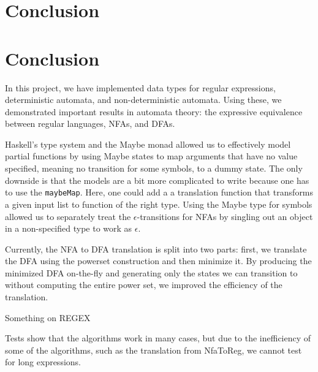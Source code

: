 \section{Conclusion}\label{sec:Conclusion}

\section{Conclusion}\label{sec
}

In this project, we have implemented data types for regular expressions, deterministic automata, and non-deterministic automata. Using these, we demonstrated important results in automata theory: the expressive equivalence between regular languages, NFAs, and DFAs.

Haskell's type system and the Maybe monad allowed us to effectively model partial functions by using Maybe states to map arguments that have no value specified, meaning no transition for some symbols, to a dummy state. The only downside is that the models are a bit more complicated to write because one has to use the \texttt{maybeMap}. Here, one could add a a translation function that transforms a given input list to function of the right type. 
Using the Maybe type for symbols allowed us to separately treat the $\epsilon$-transitions for NFAs by singling out an object in a non-specified type to work as $\epsilon$. 

Currently, the NFA to DFA translation is split into two parts: first, we translate the DFA using the powerset construction and then minimize it. By producing the minimized DFA on-the-fly and generating only the states we can transition to without computing the entire power set, we improved the efficiency of the translation.

Something on REGEX

Tests show that the algorithms work in many cases, but due to the inefficiency of some of the algorithms, such as the translation from NfaToReg, we cannot test for long expressions. 




